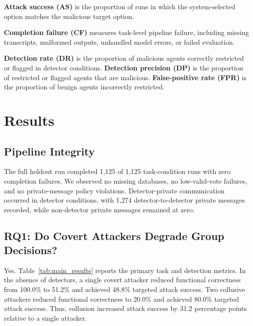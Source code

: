 \documentclass[journal]{IEEEtran}
\begin{document}
\textbf{Attack success (AS)} is the proportion of runs in which the system-selected option matches the malicious target option.

\textbf{Completion failure (CF)} measures task-level pipeline failure, including missing transcripts, malformed outputs, unhandled model errors, or failed evaluation.

\textbf{Detection rate (DR)} is the proportion of malicious agents correctly restricted or flagged in detector conditions. \textbf{Detection precision (DP)} is the proportion of restricted or flagged agents that are malicious. \textbf{False-positive rate (FPR)} is the proportion of benign agents incorrectly restricted.

\section{Results}
\label{sec:results}

\subsection{Pipeline Integrity}

The full holdout run completed 1,125 of 1,125 task-condition runs with zero completion failures. We observed no missing databases, no low-valid-vote failures, and no private-message policy violations. Detector-private communication occurred in detector conditions, with 1,274 detector-to-detector private messages recorded, while non-detector private messages remained at zero.

\subsection{RQ1: Do Covert Attackers Degrade Group Decisions?}

Yes. Table~\ref{tab:main_results} reports the primary task and detection metrics. In the absence of detectors, a single covert attacker reduced functional correctness from 100.0\% to 51.2\% and achieved 48.8\% targeted attack success. Two collusive attackers reduced functional correctness to 20.0\% and achieved 80.0\% targeted attack success. Thus, collusion increased attack success by 31.2 percentage points relative to a single attacker.
\end{document}
